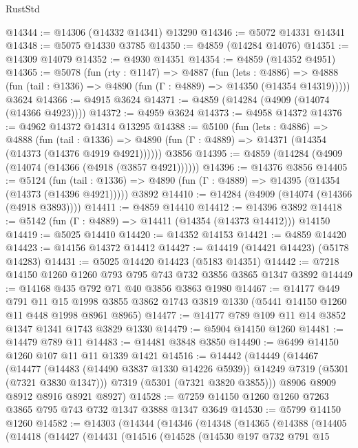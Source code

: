 \begin{lexlean}{RustStd}
\begin{coremodule}
@14344 := @14306 (@14332 @14341) @13290
@14346 := @5072 @14331 @14341
@14348 := @5075 @14330 @3785
@14350 := @4859 (@14284 @14076)
@14351 := @14309 @14079
@14352 := @4930 @14351
@14354 := @4859 (@14352 @4951)
@14365 := @5078
    (fun (rty : @1147) =>
    @4887
      (fun (lets : @4886) =>
      @4888 (fun (tail : @1336) => @4890 (fun (Γ : @4889) => @14350 (@14354 @14319)))))
    @3624
@14366 := @4915 @3624
@14371 := @4859 (@14284 (@4909 (@14074 (@14366 @4923))))
@14372 := @4959 @3624
@14373 := @4958 @14372
@14376 := @4962 @14372 @14314 @13295
@14388 := @5100
    (fun (lets : @4886) =>
    @4888
      (fun (tail : @1336) =>
      @4890 (fun (Γ : @4889) => @14371 (@14354 (@14373 (@14376 @4919 @4921))))))
    @3856
@14395 := @4859 (@14284 (@4909 (@14074 (@14366 (@4918 (@3857 @4921))))))
@14396 := @14376 @3856
@14405 := @5124
    (fun (tail : @1336) => @4890 (fun (Γ : @4889) => @14395 (@14354 (@14373 (@14396 @4921)))))
    @3892
@14410 := @14284 (@4909 (@14074 (@14366 (@4918 @3893))))
@14411 := @4859 @14410
@14412 := @14396 @3892
@14418 := @5142 (fun (Γ : @4889) => @14411 (@14354 (@14373 @14412))) @14150
@14419 := @5025 @14410
@14420 := @14352 @14153
@14421 := @4859 @14420
@14423 := @14156 @14372 @14412
@14427 := @14419 (@14421 @14423) (@5178 @14283)
@14431 := @5025 @14420 @14423 (@5183 @14351)
@14442 := @7218 @14150 @1260 @1260 @793 @795 @743 @732 @3856 @3865 @1347 @3892
@14449 := @14168 @435 @792 @71 @40 @3856 @3863 @1980
@14467 := @14177
    @449
    @791
    @11
    @15
    @1998
    @3855
    @3862
    @1743
    @3819
    @1330
    (@5441 @14150 @1260 @11 @448 @1998 @8961 @8965)
@14477 := @14177 @789 @109 @11 @14 @3852 @1347 @1341 @1743 @3829 @1330
@14479 := @5904 @14150 @1260
@14481 := @14479 @789 @11
@14483 := @14481 @3848 @3850
@14490 := @6499 @14150 @1260 @107 @11 @11 @1339 @1421
@14516 := @14442
    (@14449
      (@14467
        (@14477 (@14483 (@14490 @3837 @1330 @14226 @5939)) @14249 @7319 (@5301 (@7321 @3830 @1347)))
        @7319
        (@5301 (@7321 @3820 @3855)))
      @8906
      @8909
      @8912
      @8916
      @8921
      @8927)
@14528 := @7259 @14150 @1260 @1260 @7263 @3865 @795 @743 @732 @1347 @3888 @1347 @3649
@14530 := @5799 @14150 @1260
@14582 := @14303
    (@14344
      (@14346
        (@14348
          (@14365
            (@14388
              (@14405
                (@14418
                  (@14427
                    (@14431
                      (@14516
                        (@14528
                          (@14530
                            @197
                            @732
                            @791
                            @15

\end{coremodule}
\end{lexlean}
